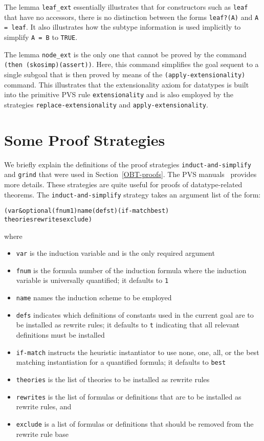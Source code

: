 \documentclass[11pt,twoside]{book}
\begin{document}
The lemma \texttt{leaf\_ext} essentially illustrates that for
constructors such as \texttt{leaf} that have no accessors, there is no
distinction between the forms \texttt{leaf?(A)} and \texttt{A = leaf}\@.
It also illustrates how the subtype information is used implicitly to
simplify \texttt{A = B} to \texttt{TRUE}\@.

The lemma \texttt{node\_ext} is the only one that cannot be proved by the
command \texttt{(then (skosimp)(assert))}\@.  Here, this command simplifies the
goal sequent to a single subgoal that is then proved by means of the \texttt{(apply-extensionality)} command.  This illustrates that the
extensionality axiom for datatypes is built into the primitive PVS
rule \texttt{extensionality} and is also employed by the strategies
\texttt{replace-extensionality} and \texttt{apply-extensionality}.




\chapter{Some Proof Strategies}\label{proof-strategies}
We briefly explain the definitions of the proof strategies
\texttt{induct-and-simplify} and \texttt{grind} that were used in 
Section~\ref{OBT-proofs}\@.  The PVS manuals~\cite{PVS:manuals} provides
more details.   These strategies are quite useful for proofs of
datatype-related theorems.  
The \texttt{induct-and-simplify} strategy takes an argument list of the form:
\begin{alltt}
  (var &optional (fnum 1) name (defs t) (if-match best)
                 theories rewrites exclude)
\end{alltt}
where
\begin{itemize}
\item \texttt{var} is the induction variable and is the only required
argument
\item \texttt{fnum} is the formula number of the induction formula where the
induction variable is universally quantified; it defaults to \texttt{1}
\item \texttt{name}  names the induction scheme to be employed
\item \texttt{defs} indicates which definitions of constants used in the
current goal are to be installed as rewrite rules; it defaults to \texttt{t}
indicating that all relevant definitions must be installed
\item \texttt{if-match} instructs the heuristic instantiator to use none,
one, all, or the best matching instantiation for a quantified formula;
it defaults to \texttt{best}
\item \texttt{theories} is the list of theories to be installed as rewrite rules
\item \texttt{rewrites} is the list of formulas or definitions that are to be
installed as rewrite rules, and
\item \texttt{exclude} is a list of formulas or definitions that should be
removed from the rewrite rule base
\end{itemize}
\end{document}
